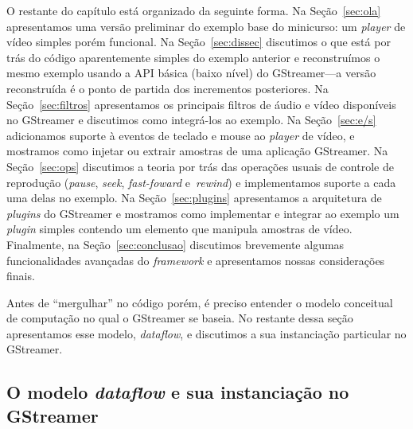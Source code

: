 \documentclass{SBCbookchapter}
\def\en#1{\foreignlanguage{english}{\emph{#1}}}
\begin{document}
O restante do capítulo está organizado da seguinte forma.  Na
Seção~\ref{sec:ola} apresentamos uma versão preliminar do exemplo base do
minicurso: um \en{player} de vídeo simples porém funcional.  Na
Seção~\ref{sec:dissec} discutimos o que está por trás do código
aparentemente simples do exemplo anterior e reconstruímos o mesmo exemplo
usando a API básica (baixo nível) do GStreamer---a versão reconstruída é o
ponto de partida dos incrementos posteriores.  Na Seção~\ref{sec:filtros}
apresentamos os principais filtros de áudio e vídeo disponíveis no GStreamer
e discutimos como integrá-los ao exemplo.  Na Seção~\ref{sec:e/s}
adicionamos suporte à eventos de teclado e mouse ao \en{player} de vídeo, e
mostramos como injetar ou extrair amostras de uma aplicação GStreamer.  Na
Seção~\ref{sec:ops} discutimos a teoria por trás das operações usuais de
controle de reprodução (\en{pause}, \en{seek}, \en{fast-foward}
e~\en{rewind}) e implementamos suporte a cada uma delas no exemplo.  Na
Seção~\ref{sec:plugins} apresentamos a arquitetura de \en{plugins} do
GStreamer e mostramos como implementar e integrar ao exemplo um
\emph{plugin} simples contendo um elemento que manipula amostras de vídeo.
Finalmente, na Seção~\ref{sec:conclusao} discutimos brevemente algumas
funcionalidades avançadas do \en{framework} e apresentamos nossas
considerações finais.

Antes de ``mergulhar'' no código porém, é preciso entender o modelo
conceitual de computação no qual o GStreamer se baseia.  No restante dessa
seção apresentamos esse modelo, \emph{dataflow}, e discutimos a sua
instanciação particular no GStreamer.


\subsection*{O modelo \en{dataflow} e sua instanciação no GStreamer}
\end{document}
